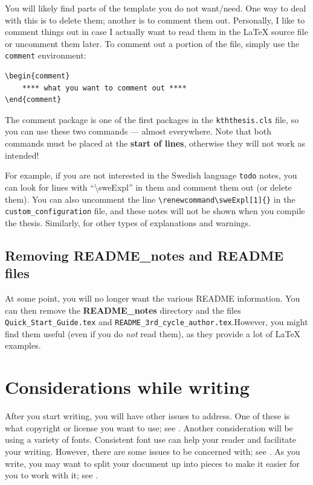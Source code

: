 \documentclass[12pt, twoside]{article}
\newcommand{\fname}[1]{\texttt{#1}}
\begin{document}
You will likely find parts of the template you do not want/need. One way to deal with this is to delete them; another is to comment them out. Personally, I like to comment things out in case I actually want to read them in the \LaTeX{} source file or uncomment them later. To comment out a portion of the file, simply use the \texttt{comment} environment:

\begin{lstlisting}[style=latexExampleForAuthors]
\begin{comment}
    **** what you want to comment out ****
\end{comment}
\end{lstlisting}
\noindent The comment package is one of the first packages in the \texttt{kththesis.cls} file, so you can use these two commands --- almost everywhere. Note that both commands must be placed at the \textbf{start of lines}, otherwise they will not work as intended!

For example, if you are not interested in the Swedish language \texttt{todo} notes, you can look for lines with \enquote{\textbackslash sweExpl} in them and comment them out (or delete them). You can also uncomment the line \texttt{\textbackslash renewcommand\textbackslash sweExpl[1]\{\}} in the \fname{custom\_configuration} file, and these notes will not be shown when you compile the thesis. Similarly, for other types of explanations and warnings.


\subsection{Removing README\_notes and README files}
\label{sec:deletingREADMEfiles}
At some point, you will no longer want the various README information. You can then remove the \textbf{README\_notes} directory and the files \fname{Quick\_Start\_Guide.tex} and \fname{README\_3rd\_cycle\_author.tex}.\linebreak[4] However, you might find them useful (even if you do \textit{not} read them), as they provide a lot of \LaTeX{} examples.

\section{Considerations while writing}
\label{sec:considerationsWhenWriting}
After you start writing, you will have other issues to address. One of these is what copyright or license you want to use; see . Another consideration will be using a variety of fonts. Consistent font use can help your reader and facilitate your writing. However, there are some issues to be concerned with; see . As you write, you may want to split your document up into pieces to make it easier for you to work with it; see .
\end{document}
